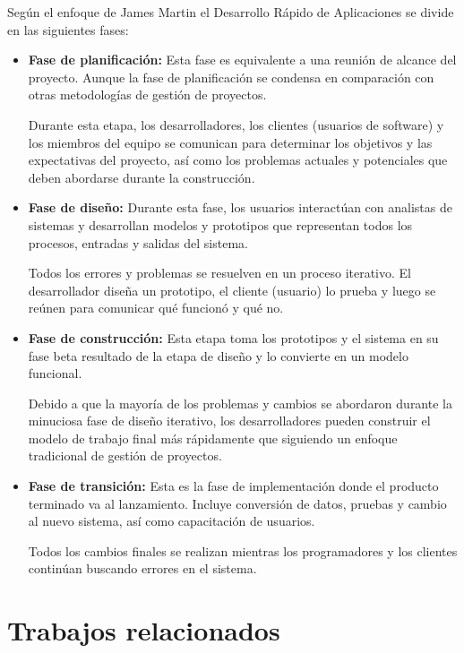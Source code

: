 Según el enfoque de James Martin \cite{RADJamesMartin} el Desarrollo Rápido de Aplicaciones se divide en las siguientes fases:

\begin{itemize}
    \item \textbf{Fase de planificación:} Esta fase es equivalente a una reunión de alcance del proyecto. Aunque la fase de planificación se condensa en comparación con otras metodologías de gestión de proyectos.

          Durante esta etapa, los desarrolladores, los clientes (usuarios de software) y los miembros del equipo se comunican para determinar los objetivos y las expectativas del proyecto, así como los problemas actuales y potenciales que deben abordarse durante la construcción.

    \item \textbf{Fase de diseño:} Durante esta fase, los usuarios interactúan con analistas de sistemas y desarrollan modelos y prototipos que representan todos los procesos, entradas y salidas del sistema.

          Todos los errores y problemas se resuelven en un proceso iterativo. El desarrollador diseña un prototipo, el cliente (usuario) lo prueba y luego se reúnen para comunicar qué funcionó y qué no.

    \item \textbf{Fase de construcción:} Esta etapa toma los prototipos y el sistema en su fase beta resultado de la etapa de diseño y lo convierte en un modelo funcional.

          Debido a que la mayoría de los problemas y cambios se abordaron durante la minuciosa fase de diseño iterativo, los desarrolladores pueden construir el modelo de trabajo final más rápidamente que siguiendo un enfoque tradicional de gestión de proyectos.

    \item \textbf{Fase de transición:} Esta es la fase de implementación donde el producto terminado va al lanzamiento. Incluye conversión de datos, pruebas y cambio al nuevo sistema, así como capacitación de usuarios.

          Todos los cambios finales se realizan mientras los programadores y los clientes continúan buscando errores en el sistema.

\end{itemize}


\section{Trabajos relacionados}

